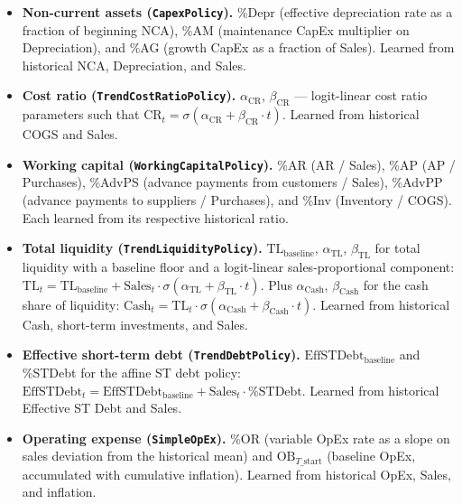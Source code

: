 \documentclass[12pt,a4paper]{article}
\begin{document}
\begin{itemize}
\item \textbf{Non-current assets (\texttt{CapexPolicy}).}
  \%Depr (effective depreciation rate as a fraction of beginning NCA),
  \%AM (maintenance CapEx multiplier on Depreciation), and \%AG
  (growth CapEx as a fraction of Sales). Learned from historical NCA,
  Depreciation, and Sales.

\item \textbf{Cost ratio (\texttt{TrendCostRatioPolicy}).}
  $\alpha_{\text{CR}}$, $\beta_{\text{CR}}$ --- logit-linear cost ratio
  parameters such that
  $\text{CR}_t = \sigma(\alpha_{\text{CR}} + \beta_{\text{CR}} \cdot t)$.
  Learned from historical COGS and Sales.

\item \textbf{Working capital (\texttt{WorkingCapitalPolicy}).}
  \%AR (AR / Sales), \%AP (AP / Purchases), \%AdvPS (advance payments
  from customers / Sales), \%AdvPP (advance payments to suppliers /
  Purchases), and \%Inv (Inventory / COGS). Each learned from its
  respective historical ratio.

\item \textbf{Total liquidity (\texttt{TrendLiquidityPolicy}).}
  $\text{TL}_{\text{baseline}}$, $\alpha_{\text{TL}}$,
  $\beta_{\text{TL}}$ for total liquidity with a baseline floor and a
  logit-linear sales-proportional component:
  $\text{TL}_t = \text{TL}_{\text{baseline}} + \text{Sales}_t \cdot
  \sigma(\alpha_{\text{TL}} + \beta_{\text{TL}} \cdot t)$. Plus
  $\alpha_{\text{Cash}}$, $\beta_{\text{Cash}}$ for the cash share of
  liquidity:
  $\text{Cash}_t = \text{TL}_t \cdot
  \sigma(\alpha_{\text{Cash}} + \beta_{\text{Cash}} \cdot t)$. Learned
  from historical Cash, short-term investments, and Sales.

\item \textbf{Effective short-term debt (\texttt{TrendDebtPolicy}).}
  $\text{EffSTDebt}_{\text{baseline}}$ and \%STDebt for the affine ST
  debt policy:
  $\text{EffSTDebt}_t = \text{EffSTDebt}_{\text{baseline}} +
  \text{Sales}_t \cdot \text{\%STDebt}$. Learned from historical
  Effective ST Debt and Sales.

\item \textbf{Operating expense (\texttt{SimpleOpEx}).}
  \%OR (variable OpEx rate as a slope on sales deviation from the
  historical mean) and $\text{OB}_{T\_\text{start}}$ (baseline OpEx,
  accumulated with cumulative inflation). Learned from historical
  OpEx, Sales, and inflation.


\end{itemize}
\end{document}

